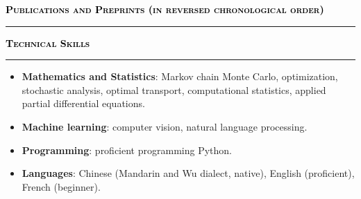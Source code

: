 \documentclass{resume} %
\renewenvironment{rSection}[1]{
\sectionskip
\textcolor{black}{\textbf{\textsc{#1}}}
\sectionlineskip
\hrule
\begin{list}{}{
\setlength{\leftmargin}{1.5em}
}
\item[]
}{
\end{list}
}
\begin{document}


\begin{rSection}{Publications and Preprints (in reversed chronological order)} \itemsep -2pt
\nocite{*}
\leavevmode\printbibliography[heading=none]

\end{rSection}

\begin{rSection}{Technical Skills} \itemsep -2pt
\begin{itemize}
    \item \textbf{Mathematics and Statistics}: Markov chain Monte Carlo, optimization, stochastic analysis, optimal transport, computational statistics, applied partial differential equations.
    \item \textbf{Machine learning}: computer vision, natural language processing.
    \item \textbf{Programming}: proficient programming Python.
    \item \textbf{Languages}: Chinese (Mandarin and Wu dialect, native), English (proficient), French (beginner).
\end{itemize}
    

\end{rSection}
\end{document}
